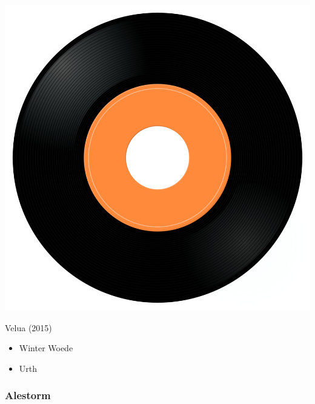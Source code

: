 \begin{minipage}[t]{0.25\textwidth}
\captionsetup{type=figure}
\includegraphics[width=\textwidth]{Images/cover.png}
\caption*{Velua (2015)}
\end{minipage}
\begin{minipage}[t]{0.25\textwidth}\vspace{0pt}
\begin{itemize}[nosep,leftmargin=1em,labelwidth=*,align=left]
	\setlength{\itemsep}{0pt}
	\item Winter Woede
	\item Urth
\end{itemize}
\end{minipage}

\subsubsection{Alestorm}

